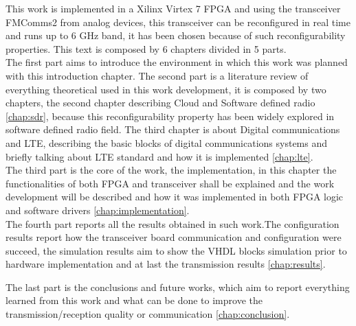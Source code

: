 This work is implemented in a Xilinx Virtex 7 FPGA and using the transceiver
FMComms2 from analog devices, this transceiver can be reconfigured in real time
and runs up to 6 GHz band, it has been chosen because of such reconfigurability
properties. This text is composed by 6 chapters divided in 5 parts.\\

The first part aims to introduce the environment in which this work was planned
with this introduction chapter. The second part is a literature review of
everything theoretical used in this work development, it is composed by two
chapters, the second chapter describing Cloud and Software defined radio
\ref{chap:sdr}, because this reconfigurability property has been widely
explored in software defined radio field. The third chapter is about Digital
communications and LTE, describing the basic blocks of digital communications
systems and briefly talking about LTE standard and how it is implemented
\ref{chap:lte}.\\

The third part is the core of the work, the implementation, in this chapter
the functionalities of both FPGA and transceiver shall be explained and the
work development will be described and how it was implemented in both FPGA
logic and software drivers \ref{chap:implementation}.\\

The fourth part reports all the results obtained in such work.The configuration
results report how the transceiver board communication and configuration were
succeed, the simulation results aim to show the VHDL blocks simulation prior to
hardware implementation and at last the transmission results \ref{chap:results}.

The last part is the conclusions and future works, which aim to report
everything learned from this work and what can be done to improve the
transmission/reception quality or communication \ref{chap:conclusion}.
